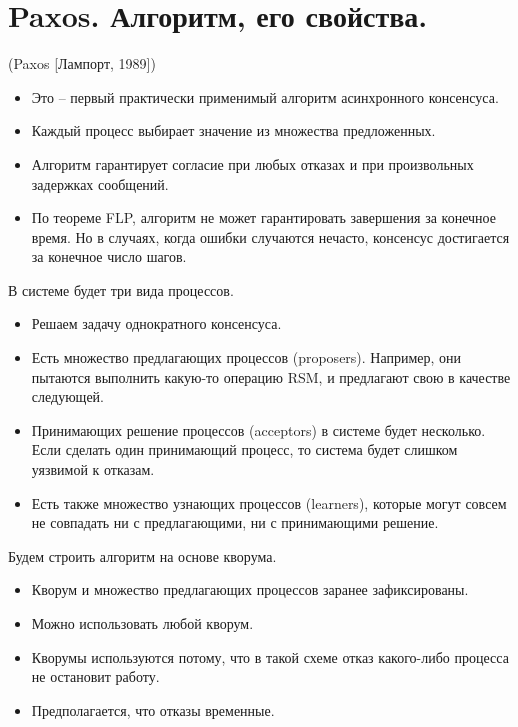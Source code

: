 \section{Paxos. Алгоритм, его свойства.}

\begin{algorithm}(Paxos [Лампорт, 1989])

    \begin{itemize}
        \item Это -- первый практически применимый алгоритм асинхронного
            консенсуса.
        \item Каждый процесс выбирает значение из множества предложенных.
        \item Алгоритм гарантирует согласие при любых отказах и при произвольных
            задержках сообщений.
        \item По теореме FLP, алгоритм не может гарантировать завершения за
            конечное время. Но в случаях, когда ошибки случаются нечасто,
            консенсус достигается за конечное число шагов.
    \end{itemize}
    В системе будет три вида процессов.
    \begin{itemize}
        \item Решаем задачу однократного консенсуса.
        \item Есть множество предлагающих процессов (proposers). Например, они
            пытаются выполнить какую-то операцию RSM, и предлагают
            свою в качестве следующей.
        \item Принимающих решение процессов (acceptors) в системе будет несколько. Если
            сделать один принимающий процесс, то система будет слишком
            уязвимой к отказам.
        \item Есть также множество узнающих процессов (learners), которые могут
            совсем не совпадать ни с предлагающими, ни с принимающими решение.
    \end{itemize}
    Будем строить алгоритм на основе кворума.
    \begin{itemize}
        \item Кворум и множество предлагающих процессов заранее зафиксированы.
        \item Можно использовать любой кворум.
        \item Кворумы используются потому, что в такой схеме отказ какого-либо
            процесса не остановит работу.
        \item Предполагается, что отказы временные.

\end{itemize}
\end{algorithm}
